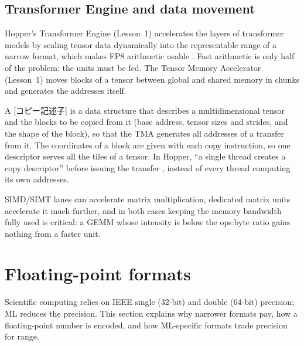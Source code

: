 \documentclass[../main.tex]{subfiles}
\begin{document}
\subsection{Transformer Engine and data movement}
\label{sec:l12-te}

Hopper's Transformer Engine (Lesson~1) accelerates the layers of
transformer models by scaling tensor data dynamically into the
representable range of a narrow format, which makes FP8 arithmetic
usable \cite{nvidia2022hopper}.  Fast arithmetic is only half of the problem:
the units must be fed.  The Tensor Memory Accelerator (Lesson~1) moves
blocks of a tensor between global and shared memory in chunks and
generates the addresses itself.

\begin{definition}
  A [コピー記述子] is a data structure that
  describes a multidimensional tensor and the blocks to be copied from it
  (base address, tensor sizes and strides, and the shape of the block), so
  that the TMA generates all addresses of a transfer from it.  The
  coordinates of a block are given with each copy instruction, so one
  descriptor serves all the tiles of a tensor.  In Hopper, \enquote{a
  single thread creates a copy descriptor} before issuing the transfer
  \cite{nvidia2022hopper}, instead of every thread computing its own
  addresses.
\end{definition}

\begin{keypoint}
  SIMD/SIMT lanes can accelerate matrix multiplication, dedicated
  matrix units accelerate it much further, and in both cases keeping
  the memory bandwidth fully used is critical: a GEMM whose intensity
  is below the ops:byte ratio gains nothing from a faster unit.
\end{keypoint}

\section{Floating-point formats}
\label{sec:l12-formats}

Scientific computing relies on IEEE single (32-bit) and double
(64-bit) precision; ML reduces the precision.
This section explains why narrower formats pay, how a floating-point
number is encoded, and how ML-specific formats trade precision for
range.
\end{document}
